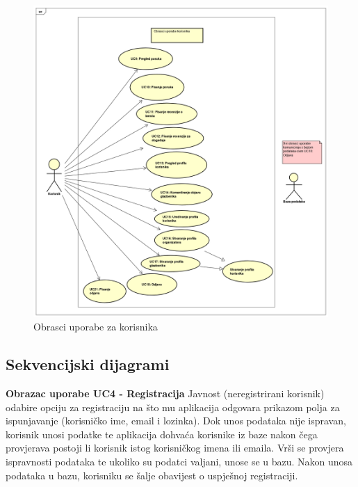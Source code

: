 		\begin{figure}[H]
			\begin{center}
				\includegraphics[width=17cm]{slike/korisnik.PNG}
			\end{center}
			\caption{Obrasci uporabe za korisnika}
			\label{fig:ou3}
		\end{figure}
				
				
			\subsection{Sekvencijski dijagrami}
				
				\textbf{Obrazac uporabe UC4 - Registracija}
				\newline
				Javnost (neregistrirani korisnik) odabire opciju za registraciju na što mu aplikacija odgovara prikazom polja za ispunjavanje (korisničko ime, email i lozinka). Dok unos podataka nije ispravan, korisnik unosi podatke te aplikacija dohvaća korisnike iz baze nakon čega provjerava postoji li korisnik istog korisničkog imena ili emaila. Vrši se provjera ispravnosti podataka te ukoliko su podatci valjani, unose se u bazu. Nakon unosa podataka u bazu, korisniku se šalje obavijest o uspješnoj registraciji. 
				
